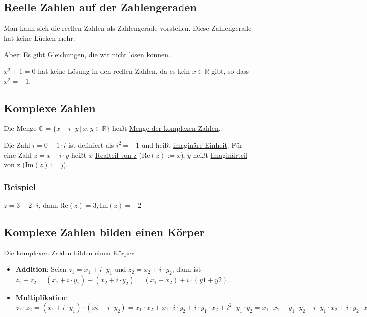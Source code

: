 \subsection{Reelle Zahlen auf der Zahlengeraden}
Man kann sich die reellen Zahlen als Zahlengerade vorstellen. Diese Zahlengerade hat keine Lücken mehr.

\begin{center}
\end{center}

Aber: Es gibt Gleichungen, die wir nicht lösen können.

$x^2 + 1 = 0$ hat keine Lösung in den reellen Zahlen, da es kein $x \in \mathbb{R}$ gibt, so dass $x^2 = -1$.

\subsection{Komplexe Zahlen}
Die Menge $\mathbb{C} = \{x + i\cdot y\,|\,x, y \in \mathbb{R}\}$ heißt \underline{Menge der komplexen Zahlen}.

Die Zahl $i = 0 + 1\cdot i$ ist definiert als $i^2 = -1$ und heißt \underline{imaginäre Einheit}. Für eine Zahl $z = x + i\cdot y$ heißt $x$ \underline{Realteil von z} ($\text{Re}(z) := x$), $y$ heißt \underline{Imaginärteil von z} ($\text{Im}(z) := y$).

\subsubsection{Beispiel}
$z = 3 - 2\cdot i$, dann $\text{Re}(z) = 3, \text{Im}(z) = -2$

\subsection{Komplexe Zahlen bilden einen Körper}
Die komplexen Zahlen bilden einen Körper.

\begin{itemize}
\item{\textbf{Addition}: Seien $z_1 = x_1 + i \cdot y_1$ und $z_2 = x_2 + i \cdot y_2$, dann ist $z_1 + z_2 = (x_1 + i \cdot y_1) + (x_2 + i \cdot y_2) = (x_1 + x_2) + i \cdot (y1 + y2)$.}
\item{\textbf{Multiplikation}: $z_1 \cdot z_2 = (x_1 + i \cdot y_1) \cdot (x_2 + i \cdot y_2) = x_1 \cdot x_2 + x_1 \cdot i \cdot y_2 + i \cdot y_1 \cdot x_2 + i^2 \cdot y_1 \cdot y_2 = x_1 \cdot x_2 - y_1 \cdot y_2 + i \cdot y_1 \cdot x_2 + i \cdot y_2 \cdot x_1 = (x_1 \cdot x_2 - y_1 \cdot y_2) + i \cdot (x_1 \cdot y_2 + x_2 \cdot y_1)$}
\end{itemize}

